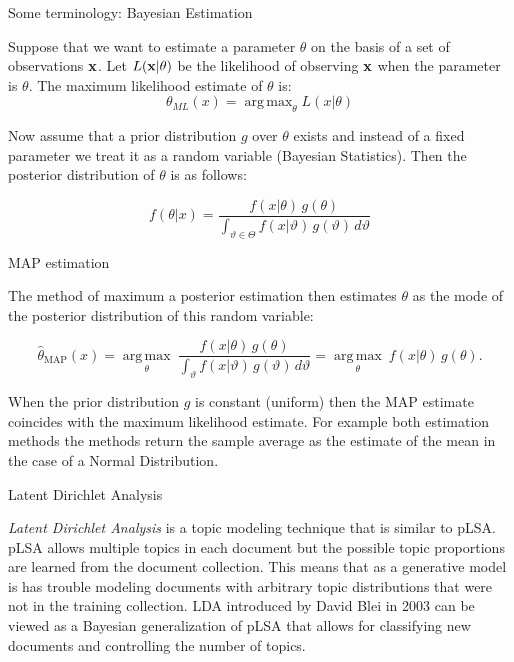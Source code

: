 \documentclass[12pt]{beamer}
\DeclareMathOperator*{\argmax}{arg\,max}
\begin{document}
\begin{frame}{Some terminology: Bayesian Estimation} 

Suppose that we want to estimate a parameter $\theta$ on the basis 
of a set of observations ${\bf x}$. Let $L({\bf x}|\theta)$ be the likelihood of observing ${\bf x}$ when the parameter is $\theta$. The maximum likelihood estimate of $\theta$ is: 
\[
\theta_{ML}(x) = \argmax_{\theta} L(x | \theta)
\]

Now assume that a prior distribution $g$ over $\theta$ exists and
instead of a fixed parameter we treat it as a random variable
(Bayesian Statistics). Then the posterior distribution of $\theta$ is as follows: 

\[
f(\theta | x) = \frac{f(x | \theta) \,
  g(\theta)}{\displaystyle\int_{\vartheta \in \Theta} f(x | \vartheta)
  \, g(\vartheta) \, d\vartheta} \!
\]

\end{frame} 

\begin{frame}{MAP estimation} 

The method of maximum a posterior estimation then estimates 
$\theta$ as the mode of the posterior distribution of this random 
variable: 

\[
\hat{\theta}_{\mathrm{MAP}}(x)
= \underset{\theta}{\operatorname{arg\,max}} \ \frac{f(x | \theta) \, g(\theta)}
  {\displaystyle\int_{\vartheta} f(x | \vartheta) \, g(\vartheta) \, d\vartheta}
= \underset{\theta}{\operatorname{arg\,max}} \ f(x | \theta) \, g(\theta).
\]

When the prior distribution $g$ is constant (uniform) then the MAP
estimate coincides with the maximum likelihood estimate. For example
both estimation methods the methods return the sample average as the
estimate of the mean in the case of a Normal Distribution. 

\end{frame} 


\begin{frame}{Latent Dirichlet Analysis} 

{\it Latent Dirichlet Analysis} is a topic modeling technique that is
similar to pLSA. pLSA allows multiple topics in each document but the
possible topic proportions are learned from the document
collection. This means that as a generative model is has trouble
modeling documents with arbitrary topic distributions that were not in
the training collection. LDA introduced by David Blei in 2003 can be
viewed as a Bayesian generalization of pLSA that allows for
classifying new documents and controlling the number of topics.
\end{frame}
\end{document}
